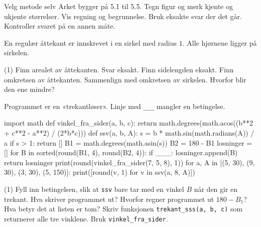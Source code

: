 
\begin{infoboks}{Velg metode selv}
Arket bygger på 5.1 til 5.5. Tegn figur og merk kjente og ukjente størrelser. Vis regning og begrunnelse.
Bruk eksakte svar der det går. Kontroller svaret på en annen måte.
\end{infoboks}


En regulær åttekant er innskrevet i en sirkel med radius $1$. Alle hjørnene ligger på sirkelen.
\begin{tasks}(1)
  \task Finn arealet av åttekanten. Svar eksakt.
  \task Finn sidelengden eksakt.
  \task Finn omkretsen av åttekanten. Sammenlign med omkretsen av sirkelen. Hvorfor blir den ene mindre?
\end{tasks}

Programmet er en «trekantløser». Linje med \lstinline[style=laereverk,numbers=none,frame=none]|___| mangler en betingelse.
\begin{kode}
import math
def vinkel_fra_sider(a, b, c):
    return math.degrees(math.acos((b**2 + c**2 - a**2) / (2*b*c)))
def ssv(a, b, A):
    s = b * math.sin(math.radians(A)) / a
    if s > 1:
        return []
    B1 = math.degrees(math.asin(s))
    B2 = 180 - B1
    losninger = []
    for B in sorted({round(B1, 4), round(B2, 4)}):
        if ___:
            losninger.append(B)
    return losninger
print(round(vinkel_fra_sider(7, 5, 8), 1))
for a, A in [(5, 30), (9, 30), (3, 30), (5, 150)]:
    print([round(v, 1) for v in ssv(a, 8, A)])
\end{kode}
\begin{tasks}(1)
  \task Fyll inn betingelsen, slik at \lstinline[style=laereverk,numbers=none,frame=none]|ssv| bare tar med en vinkel $B$ når den gir en trekant. Hva skriver programmet ut?
  \task Hvorfor regner programmet ut $180 - B_1$? Hva betyr det at listen er tom?
  \task Skriv funksjonen \lstinline[style=laereverk,numbers=none,frame=none]|trekant_sss(a, b, c)| som returnerer alle tre vinklene. Bruk \lstinline[style=laereverk,numbers=none,frame=none]|vinkel_fra_sider|.
\end{tasks}


